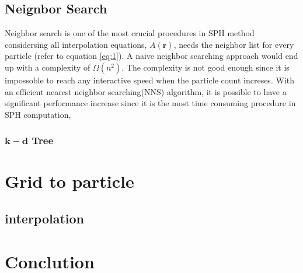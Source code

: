     \subsection{Neignbor Search}
    Neighbor search is one of the most crucial procedures in SPH method considersing all interpolation equations, $A(\textbf{r})$, needs the neighbor list for every particle (refer to equation \ref{eq:1}). A naive neighbor searching approach would end up with a complexity of $\Omega(n^2)$. The complexity is not good enough since it is impossoble to reach any interactive speed when the particle count increses. With an efficient nearest neighbor searching(NNS) algorithm, it is possible to have a significant performance increase since it is the most time consuming procedure in SPH computation,

        \subsubsection{$\mathbf{k-d}$ Tree}



\section{Grid to particle}
    \subsection{interpolation}

\section{Conclution}